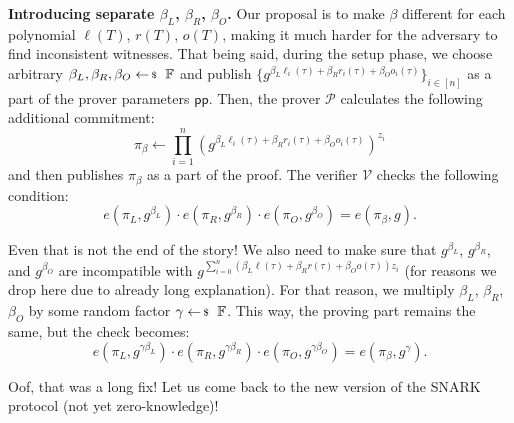 \documentclass[../../book.tex]{subfiles}
\begin{document}
\textbf{Introducing separate $\beta_L$, $\beta_R$, $\beta_O$.} Our proposal is to make $\beta$ different for each polynomial $\ell(T)$, $r(T)$, $o(T)$, making it much harder for the adversary to find inconsistent witnesses. That being said, during the setup phase, we choose arbitrary $\beta_L,\beta_R,\beta_O \leftarrowS \mathbb{F}$ and publish $\{g^{\beta_L\ell_i(\tau)+\beta_Rr_i(\tau)+\beta_Oo_i(\tau)}\}_{i \in [n]}$ as a part of the prover parameters $\mathsf{pp}$. Then, the prover $\mathcal{P}$ calculates the following additional commitment:
\begin{equation*}
    \pi_{\beta} \gets \prod_{i=1}^n (g^{\beta_L\ell_i(\tau) + \beta_Rr_i(\tau) + \beta_Oo_i(\tau)})^{z_i}
\end{equation*}
and then publishes $\pi_{\beta}$ as a part of the proof. The verifier $\mathcal{V}$ checks the following condition:
\begin{equation*}
    e(\pi_L, g^{\beta_L}) \cdot e(\pi_R, g^{\beta_R}) \cdot e(\pi_O, g^{\beta_O}) = e(\pi_{\beta}, g).
\end{equation*}

Even that is not the end of the story! We also need to make sure that $g^{\beta_L}$, $g^{\beta_R}$, and $g^{\beta_O}$ are incompatible with $g^{\sum_{i=0}^n (\beta_L\ell(\tau) + \beta_Rr(\tau) + \beta_Oo(\tau))z_i}$ (for reasons we drop here due to already long explanation). For that reason, we multiply $\beta_L$, $\beta_R$, $\beta_O$ by some random factor $\gamma \leftarrowS \mathbb{F}$. This way, the proving part remains the same, but the check becomes:
\begin{equation*}
    e(\pi_L, g^{\gamma\beta_L}) \cdot e(\pi_R, g^{\gamma\beta_R}) \cdot e(\pi_O, g^{\gamma\beta_O}) = e(\pi_{\beta}, g^{\gamma}).
\end{equation*}

Oof, that was a long fix! Let us come back to the new version of the SNARK protocol (not yet zero-knowledge)!
\end{document}
